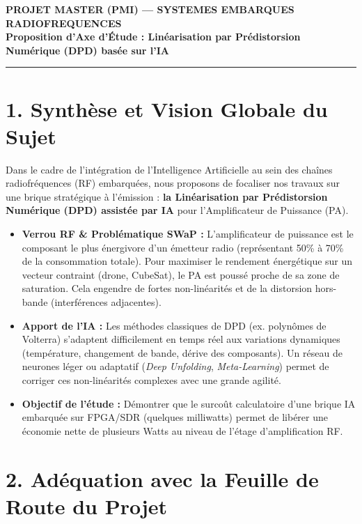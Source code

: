 \documentclass[11pt, a4paper]{article}
\begin{document}
\begin{center}
    {\small \textbf{PROJET MASTER (PMI) --- SYSTEMES EMBARQUES RADIOFREQUENCES}}\\[0.5em]
    {\Large \textbf{\color{primary} Proposition d'Axe d'Étude : Linéarisation par Prédistorsion Numérique (DPD) basée sur l'IA}} \\[0.5em]
    \rule{\textwidth}{1pt}
\end{center}

\vspace{0.5em}

\section*{1. Synthèse et Vision Globale du Sujet}
Dans le cadre de l'intégration de l'Intelligence Artificielle au sein des chaînes radiofréquences (RF) embarquées, nous proposons de focaliser nos travaux sur une brique stratégique à l'émission : \textbf{la Linéarisation par Prédistorsion Numérique (DPD) assistée par IA} pour l'Amplificateur de Puissance (PA).

\begin{itemize}
    \item \textbf{Verrou RF \& Problématique SWaP :} L'amplificateur de puissance est le composant le plus énergivore d'un émetteur radio (représentant 50\% à 70\% de la consommation totale). Pour maximiser le rendement énergétique sur un vecteur contraint (drone, CubeSat), le PA est poussé proche de sa zone de saturation. Cela engendre de fortes non-linéarités et de la distorsion hors-bande (interférences adjacentes).
    \item \textbf{Apport de l'IA :} Les méthodes classiques de DPD (ex. polynômes de Volterra) s'adaptent difficilement en temps réel aux variations dynamiques (température, changement de bande, dérive des composants). Un réseau de neurones léger ou adaptatif (\textit{Deep Unfolding}, \textit{Meta-Learning}) permet de corriger ces non-linéarités complexes avec une grande agilité.
    \item \textbf{Objectif de l'étude :} Démontrer que le surcoût calculatoire d'une brique IA embarquée sur FPGA/SDR (quelques milliwatts) permet de libérer une économie nette de plusieurs Watts au niveau de l'étage d'amplification RF.
\end{itemize}

\section*{2. Adéquation avec la Feuille de Route du Projet}
\end{document}
